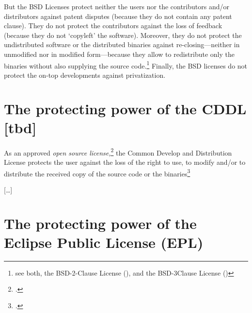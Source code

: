 But the BSD Licenses protect neither the users nor the contributors
and/or distributors against patent disputes (because they do not contain any
patent clause). They do not protect the contributors against the loss of
feedback (because they do not `copyleft' the software). Moreover, they do not
protect the undistributed software or the distributed binaries against
re-closing---neither in unmodified nor in modified form---because they
allow to redistribute only the binaries without also supplying the source
code.\footnote{see both, the BSD-2-Clause License (\cite[cf.][\nopage
wp]{BsdLicense2Clause}), and the BSD-3Clause License (\cite[cf.][\nopage
wp]{BsdLicense3Clause})} Finally, the BSD licenses do not protect the on-top
developments against privatization.

\section{\texorpdfstring{The protecting power of the}{The} CDDL [tbd]}

As an approved \emph{open source license,}\footcite[cf.][\nopage wp]{OSI2012b}
the Common Develop and Distribution License protects the user
against the loss of the right to use, to modify and/or to distribute the
received copy of the source code or the binaries\footcite[cf.][\nopage wp. 
§?]{Cddl10OsiLicense2004a}

[\ldots]

\section{\texorpdfstring{The protecting power of the}{The} Eclipse Public License (EPL)}

